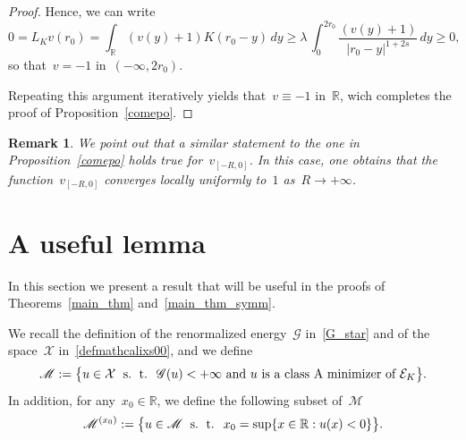 \documentclass[10pt,a4paper]{amsart}
\newtheorem{rem}[theorem]{Remark}
\numberwithin{equation}{section}
\newcommand{\R}{\mathbb{R}}
\newcommand{\Ec}{\mathcal{E}_K}
\begin{document}
\begin{proof}
Hence, we can write
\begin{equation*}
0=  {L}_K v (r_0) =  \int_{\R}( v(y)+1) K(r_0-y)\, dy \geq \lambda \,  \int_{0}^{2r_0} \frac{( v(y)+1)}{|r_0-y|^{1+2s}}\, dy \geq 0,
\end{equation*}
so that~$v =-1$ in~$(-\infty,2r_0)$.

Repeating this argument iteratively yields that~$v \equiv -1$ in~$\R$,
wich completes the proof of Proposition~\ref{comepo}.
\end{proof}

\begin{rem}\label{remm}
{\rm
We point out that a similar statement to the one in Proposition~\ref{comepo} holds true for~$v_{[-R,0]}$. In this case,
one obtains that the function~$v_{[-R,0]}$ converges locally uniformly to~$1$ as~$R\to +\infty$. 
}
\end{rem}

     \section{A useful lemma}\label{usflemma}
     
 In this section we present a result that will be useful in the proofs of Theorems~\ref{main_thm} and~\ref{main_thm_symm}.   
   
   We recall the definition of the
   renormalized energy~$\mathscr{G}$ in~\eqref{G_star}
   and of
   the space~${\mathcal{X}}$ in~\eqref{defmathcalixs00}, and we define
     \begin{equation}\label{emme}
     \mathscr{M}:= \big\{ u \in \mathcal{X}\;{\mbox{ s. ~\!t. }}\; \mathscr{G}(u)<+\infty \text{ and~$u$ is a class~A minimizer of} \ \Ec\big\}.
\end{equation}
In addition, for any~$x_0\in \R$, we define the following subset of~$\mathscr{M}$
\begin{equation}\label{emmezero}
 \mathscr{M}^{(x_0)} := \big\{u \in \mathscr{M}\;{\mbox{ s. ~\!t. }}\;x_0= \sup\{x\in \R: u(x)<0\}\big\}.
\end{equation}
\end{document}
